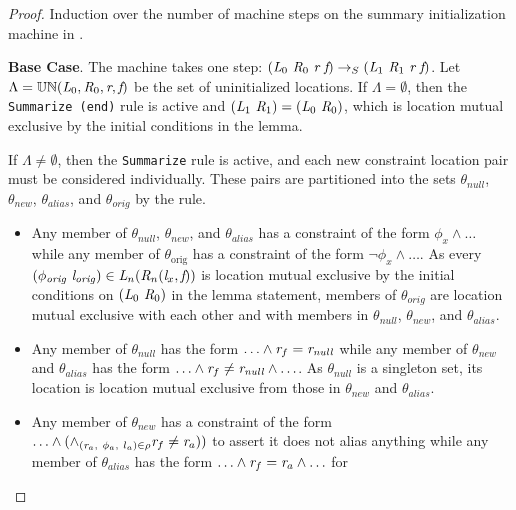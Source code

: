 \begin{proof}
Induction over the number of machine steps on the summary initialization machine in .

\noindent\textbf{Base Case}. The machine takes one step: $(\emph{L}_0\ \emph{R}_0\ \emph{r}\ \emph{f})
\rightarrow_S
(\emph{L}_1\ \emph{R}_1\ \emph{r}\ \emph{f})$. Let $\Lambda = \mathbb{UN}(\emph{L}_0, \emph{R}_0, \emph{r},
\emph{f})$ be the set of uninitialized locations. If $\Lambda = \emptyset$, then the \texttt{Summarize (end)}
rule is active and $(\cfgnt{L}_1\ \cfgnt{R}_1) = (\cfgnt{L}_0\ \cfgnt{R}_0)$, which is location mutual exclusive by the initial conditions in the lemma.

If $\Lambda \neq \emptyset$, then the \texttt{Summarize} rule is
active, and each new constraint location pair must be considered
individually. These pairs are partitioned into the sets
$\theta_\mathit{null}$, $\theta_\mathit{new}$,
$\theta_\mathit{alias}$, and $\theta_\mathit{orig}$ by the rule. 
\begin{itemize}
\item Any member of $\theta_\mathit{null}$, $\theta_\mathit{new}$, and
  $\theta_\mathit{alias}$ has a constraint of the form $\phi_x \wedge
  \ldots$ while any member of $\theta_\mathrm{orig}$ has a constraint
  of the form $\neg \phi_x \wedge \ldots$. As every
  $(\phi_\mathit{orig}\ \cfgnt{l}_\mathit{orig}) \in
  \cfgnt{L}_n(\cfgnt{R}_n(\cfgnt{l}_x,\cfgnt{f}))$ is location mutual exclusive
  by the initial conditions on $(\emph{L}_0\ \emph{R}_0)$ in the lemma statement, members of $\theta_\mathit{orig}$ are location
  mutual exclusive with each other and with members in $\theta_\mathit{null}$,
  $\theta_\mathit{new}$, and $\theta_\mathit{alias}$.
\item Any member of $\theta_\mathit{null}$ has the form $\ldots \wedge
  \emph{r}_f = \emph{r}_\mathit{null}$ while any member of
  $\theta_\mathit{new}$ and $\theta_\mathit{alias}$ has the form
  $\ldots \wedge \emph{r}_f \neq \emph{r}_\mathit{null} \wedge
  \ldots$. As $\theta_\mathit{null}$ is a singleton set, its location is
  location mutual exclusive from those in $\theta_\mathit{new}$ and
  $\theta_\mathit{alias}$.
\item Any member of $\theta_\mathit{new}$ has a constraint of the form
  $\ldots \wedge ( \wedge_{(
  \emph{r}_a,\ \phi_a,\ l_a) \in \rho}
  \emph{r}_f \ne \emph{r}_a) )$ to assert it does not
  alias anything while any member of $\theta_\mathit{alias}$ has
  the form $\ldots \wedge \emph{r}_f = \emph{r}_a \wedge \ldots$ for

\end{itemize}
\end{proof}
